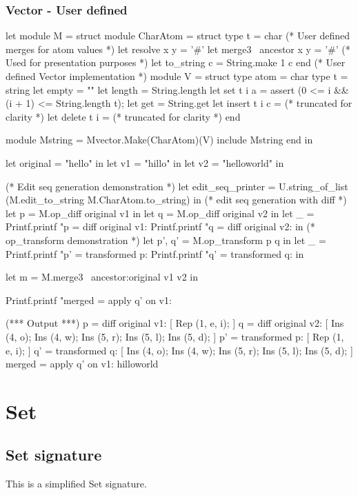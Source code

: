 \documentclass{article}
\begin{document}
\subsubsection{Vector - User defined}
\begin{longlisting}
let module M = struct
  module CharAtom = struct
    type t = char
    (* User defined merges for atom values *)
    let resolve x y = '#'
    let merge3 ~ancestor x y = '#'
    (* Used for presentation purposes *)
    let to_string c = String.make 1 c
  end
  (* User defined Vector implementation *)
  module V = struct
    type atom = char
    type t = string
    let empty = ""
    let length = String.length
    let set t i a =
      assert (0 <= i && (i + 1) <= String.length t);
    let get = String.get
    let insert t i c =
      (* truncated for clarity *)
    let delete t i =
      (* truncated for clarity *)
  end

  module Mstring = Mvector.Make(CharAtom)(V)
  include Mstring
end in

let original = "hello" in
let v1 = "hillo" in
let v2 = "helloworld" in

(* Edit seq generation demonstration *)
let edit_seq_printer = U.string_of_list (M.edit_to_string M.CharAtom.to_string) in
(* edit seq generation with diff *)
let p = M.op_diff original v1 in
let q = M.op_diff original v2 in
let _ = 
  Printf.printf "p = diff original v1: %
  Printf.printf "q = diff original v2: %
in
  (* op_transform demonstration *)
  let p', q' = M.op_transform p q in
  let _ = 
    Printf.printf "p' = transformed p: %
    Printf.printf "q' = transformed q: %
  in

let m = M.merge3 ~ancestor:original v1 v2 in

Printf.printf "merged = apply q' on v1: %

(*** Output ***)
p = diff original v1: [ Rep (1, e, i); ]
q = diff original v2: [ Ins (4, o); Ins (4, w); Ins (5, r); Ins (5, l); Ins (5, d); ]
p' = transformed p: [ Rep (1, e, i); ]
q' = transformed q: [ Ins (4, o); Ins (4, w); Ins (5, r); Ins (5, l); Ins (5, d); ]
merged = apply q' on v1: hilloworld
\end{longlisting}

\newpage
\section{Set}
\subsection{Set signature}
This is a simplified Set signature. 
\end{document}
